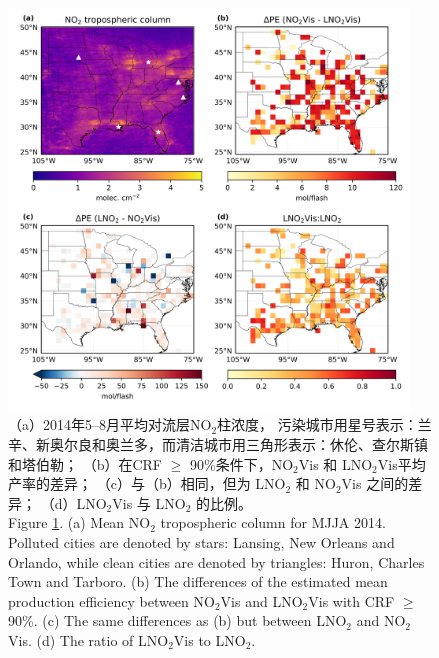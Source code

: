 \begin{figure}[H]
\centering
\includegraphics[width=0.95\textwidth]{./figures/us_delta.png}
\caption{（a）2014年5--8月平均对流层NO$_2$柱浓度，
污染城市用星号表示：兰辛、新奥尔良和奥兰多，而清洁城市用三角形表示：休伦、查尔斯镇和塔伯勒；
（b）在CRF $\geq$ 90\%条件下，NO$_2$Vis 和 LNO$_2$Vis平均产率的差异；
（c）与（b）相同，但为 LNO$_2$ 和 NO$_2$Vis 之间的差异；
（d）LNO$_2$Vis 与 LNO$_2$ 的比例。\\
Figure \ref{fig:us_delta}.
(a) Mean NO$_2$ tropospheric column for MJJA 2014.
Polluted cities are denoted by stars: Lansing, New Orleans and Orlando, while clean cities are denoted by triangles: Huron, Charles Town and Tarboro.
(b) The differences of the estimated mean production efficiency between NO$_2$Vis and LNO$_2$Vis with CRF $\geq$ 90\%.
(c) The same differences as (b) but between LNO$_2$ and NO$_2$Vis.
(d) The ratio of LNO$_2$Vis to LNO$_2$.
}
\label{fig:us_delta}
\end{figure}

